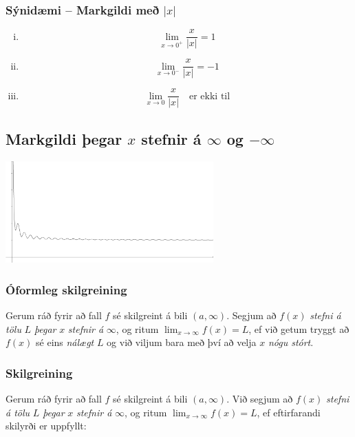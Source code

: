 \documentclass[icelandic,a4paper,12pt]{article}
\begin{document}
\subsubsection{Sýnidæmi -- Markgildi með $|x|$}
\begin{enumerate}[(i)] 
  \item $$\lim_{x\to 0^+} \frac x{|x|} = 1$$
  \pause
  \item $$\lim_{x\to 0^-} \frac x{|x|} = -1$$
  \pause
  \item $$\lim_{x\to 0} \frac x{|x|} \quad \text{er ekki til}$$
\end{enumerate}

\subsection{Markgildi þegar $x$ stefnir á $\infty$ og $-\infty$}
\begin{center}
  \includegraphics[width=8cm,keepaspectratio=true]{./myndir/kafli02/06_liminf.png}
\end{center}

\subsubsection{Óformleg skilgreining}
Gerum ráð fyrir að fall $f$ sé
skilgreint á bili $(a, \infty)$.  Segjum að  $f(x)$
\emph{stefni á tölu} $L$ \emph{þegar} $x$ \emph{stefnir á} $\infty$, og ritum
$\lim_{x\rightarrow \infty} f(x)=L$, ef við getum tryggt að  $f(x)$ sé eins
\emph{nálægt}
$L$ og við viljum bara með því að velja $x$ \emph{nógu stórt}.

\subsubsection{Skilgreining}
Gerum ráð fyrir að fall $f$ sé
skilgreint á bili $(a,\infty)$.  Við segjum að $f(x)$
\emph{stefni á tölu} $L$ \emph{þegar} $x$ \emph{stefnir á} $\infty$, og ritum
$\lim_{x\rightarrow \infty} f(x)=L$, ef eftirfarandi skilyrði er uppfyllt:
\end{document}
